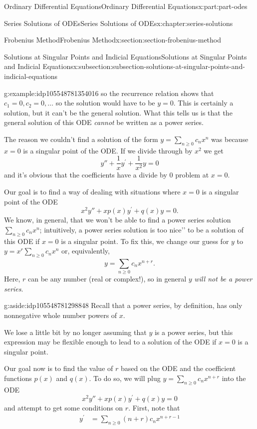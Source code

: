 \documentclass[oneside,10pt,]{book}
\numberwithin{equation}{part}
\newcommand{\amp}{&}
\begin{document}
\begin{partptx}{Ordinary Differential Equations}{}{Ordinary Differential Equations}{}{}{x:part:part-odes}
\begin{chapterptx}{Series Solutions of ODEs}{}{Series Solutions of ODEs}{}{}{x:chapter:series-solutions}
\begin{sectionptx}{Frobenius Method}{}{Frobenius Method}{}{}{x:section:section-frobenius-method}
\begin{subsectionptx}{Solutions at Singular Points and Indicial Equations}{}{Solutions at Singular Points and Indicial Equations}{}{}{x:subsection:subsection-solutions-at-singular-points-and-indicial-equations}
\begin{example}{}{g:example:idp105548781354016}
so the recurrence relation shows that \(c_{1} = 0, c_{2} = 0,\ldots\) so the solution would have to be \(y=0\). This is certainly a solution, but it can't be the general solution. What this tells us is that the general solution of this ODE \emph{cannot} be written as a power series.%
\end{example}
The reason we couldn't find a solution of the form \(y=\sum_{n\geq0}^{}c_{n}x^{n}\) was because \(x=0\) is a singular point of the ODE. If we divide through by \(x^{2}\) we get%
\begin{equation*}
y''+\frac{1}{x}y^\prime+\frac{1}{x^{2}}y = 0
\end{equation*}
and it's obvious that the coefficients have a divide by \(0\) problem at \(x=0\).%
\par
Our goal is to find a way of dealing with situations where \(x=0\) is a singular point of the ODE%
\begin{equation*}
x^{2}y''+xp(x)y^\prime+q(x)y=0.
\end{equation*}
We know, in general, that we won't be able to find a power series solution \(\sum_{n\geq0}^{}c_{n}x^{n}\); intuitively, a power series solution is too \textasciigrave{}\textasciigrave{}nice'{}'{} to be a solution of this ODE if \(x=0\) is a singular point. To fix this, we change our guess for \(y\) to \(y=x^{r}\sum_{n\geq0}^{}c_{n}x^{n}\) or, equivalently,%
\begin{equation*}
y = \sum_{n\geq0}^{}c_{n}x^{n+r}.
\end{equation*}
Here, \(r\) can be any number (real or complex!), so in general \(y\) \emph{will not be a power series}. \begin{aside}{}{g:aside:idp105548781298848}%
Recall that a power series, by definition, has only nonnegative whole number powers of \(x\).%
\end{aside}
 We lose a little bit by no longer assuming that \(y\) is a power series, but this expression may be flexible enough to lead to a solution of the ODE if \(x=0\) is a singular point.%
\par
Our goal now is to find the value of \(r\) based on the ODE and the coefficient functions \(p(x)\) and \(q(x)\). To do so, we will plug \(y=\sum_{n\geq0}^{}c_{n}x^{n+r}\) into the ODE%
\begin{equation*}
x^{2}y''+xp(x)y^\prime+q(x)y = 0
\end{equation*}
and attempt to get some conditions on \(r\). First, note that%
\begin{align*}
y^\prime \amp= \sum_{n\geq0}^{}(n+r)c_{n}x^{n+r-1}\\

\end{align*}
\end{subsectionptx}
\end{sectionptx}
\end{chapterptx}
\end{partptx}
\end{document}
